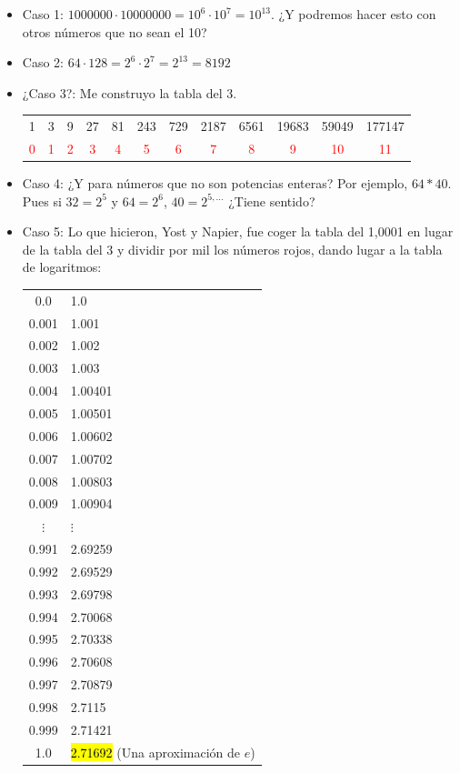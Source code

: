 \begin{itemize}
\item Caso 1: $1000000·10000000 = 10^6·10^7 = 10^{13}$. ¿Y podremos hacer esto con otros números que no sean el 10?

\item Caso 2: $64·128 = 2^6·2^7 = 2^{13} = 8192$
\item ¿Caso 3?: Me construyo la tabla del 3.
\begin{center}
\begin{tabular}{cccccccccccc}
1& 3& 9& 27& 81& 243& 729& 2187& 6561& 19683& 59049& 177147\\
\textcolor{red}{0} & \textcolor{red}{1} & \textcolor{red}{2} & \textcolor{red}{3} & \textcolor{red}{4} & \textcolor{red}{5} & \textcolor{red}{6} & \textcolor{red}{7} & \textcolor{red}{8} & \textcolor{red}{9} & \textcolor{red}{10} & \textcolor{red}{11}
\end{tabular}
\end{center}
\item Caso 4: ¿Y para números que no son potencias enteras? Por ejemplo, $64*40$. Pues si $32=2^5$ y $64=2^6$, $40=2^{5,...}$ ¿Tiene sentido?
\item Caso 5: Lo que hicieron, Yost y Napier, fue coger la tabla del 1,0001 en lugar de la tabla del 3 y dividir por mil los números rojos, dando lugar a la tabla de logaritmos:

\begin{center}
	\begin{tabular}{cl}
		0.0 & 1.0\\
		0.001 & 1.001\\
		0.002 & 1.002\\
		0.003 & 1.003\\
		0.004 & 1.00401\\
		0.005 & 1.00501\\
		0.006 & 1.00602\\
		0.007 & 1.00702\\
		0.008 & 1.00803\\
		0.009 & 1.00904\\
		$\vdots$ & \quad\quad$\vdots$\\
		0.991 & 2.69259\\
		0.992 & 2.69529\\
		0.993 & 2.69798\\
		0.994 & 2.70068\\
		0.995 & 2.70338\\
		0.996 & 2.70608\\
		0.997 & 2.70879\\
		0.998 & 2.7115\\
		0.999 & 2.71421\\
		1.0 & \hl{2.71692} (Una aproximación de $e$)\\
	\end{tabular}
\end{center}

\end{itemize}

